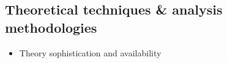 \subsection{Theoretical techniques \& analysis methodologies}

\begin{itemize}
\item Theory sophistication and availability

\end{itemize}